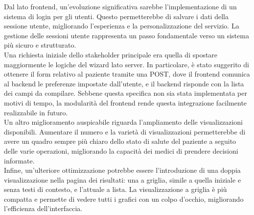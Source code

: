 Dal lato frontend, un'evoluzione significativa sarebbe l'implementazione di un sistema di login per gli utenti. Questo permetterebbe di salvare i dati della sessione utente, migliorando l'esperienza e la personalizzazione del servizio. La gestione delle sessioni utente rappresenta un passo fondamentale verso un sistema più sicuro e strutturato.\\
Una richiesta iniziale dello stakeholder principale era quella di spostare maggiormente le logiche del wizard lato server. In particolare, è stato suggerito di ottenere il form relativo al paziente tramite una POST, dove il frontend comunica al backend le preferenze impostate dall'utente, e il backend risponde con la lista dei campi da compilare. Sebbene questa specifica non sia stata implementata per motivi di tempo, la modularità del frontend rende questa integrazione facilmente realizzabile in futuro.\\
Un altro miglioramento auspicabile riguarda l'ampliamento delle visualizzazioni disponibili. Aumentare il numero e la varietà di visualizzazioni permetterebbe di avere un quadro sempre più chiaro dello stato di salute del paziente a seguito delle varie operazioni, migliorando la capacità dei medici di prendere decisioni informate.\\
Infine, un'ulteriore ottimizzazione potrebbe essere l'introduzione di una doppia visualizzazione nella pagina dei risultati: una a griglia, simile a quella iniziale e senza testi di contesto, e l'attuale a lista. La visualizzazione a griglia è più compatta e permette di vedere tutti i grafici con un colpo d'occhio, migliorando l'efficienza dell'interfaccia.\\

